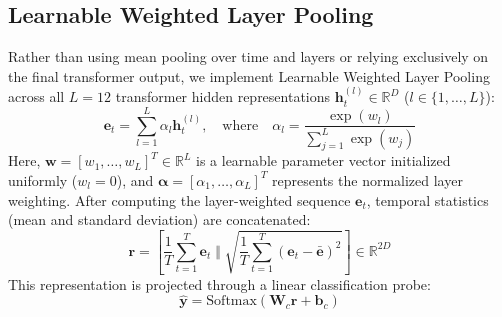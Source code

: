 \documentclass[10pt,journal,compsoc]{IEEEtran}
\begin{document}
\subsection{Learnable Weighted Layer Pooling}
Rather than using mean pooling over time and layers or relying exclusively on the final transformer output, we implement Learnable Weighted Layer Pooling across all $L = 12$ transformer hidden representations $\mathbf{h}_t^{(l)} \in \mathbb{R}^D$ ($l \in \{1, \dots, L\}$):
\begin{equation}
\mathbf{e}_t = \sum_{l=1}^{L} \alpha_l \mathbf{h}_t^{(l)}, \quad \text{where} \quad \alpha_l = \frac{\exp(w_l)}{\sum_{j=1}^{L} \exp(w_j)}
\label{eq:pooling}
\end{equation}
Here, $\mathbf{w} = [w_1, \dots, w_L]^T \in \mathbb{R}^L$ is a learnable parameter vector initialized uniformly ($w_l = 0$), and $\boldsymbol{\alpha} = [\alpha_1, \dots, \alpha_L]^T$ represents the normalized layer weighting. After computing the layer-weighted sequence $\mathbf{e}_t$, temporal statistics (mean and standard deviation) are concatenated:
\begin{equation}
\mathbf{r} = \left[ \frac{1}{T} \sum_{t=1}^{T} \mathbf{e}_t \; \Vert \; \sqrt{\frac{1}{T} \sum_{t=1}^{T} (\mathbf{e}_t - \bar{\mathbf{e}})^2} \right] \in \mathbb{R}^{2D}
\end{equation}
This representation is projected through a linear classification probe:
\begin{equation}
\hat{\mathbf{y}} = \text{Softmax}(\mathbf{W}_c \mathbf{r} + \mathbf{b}_c)
\end{equation}
\end{document}
